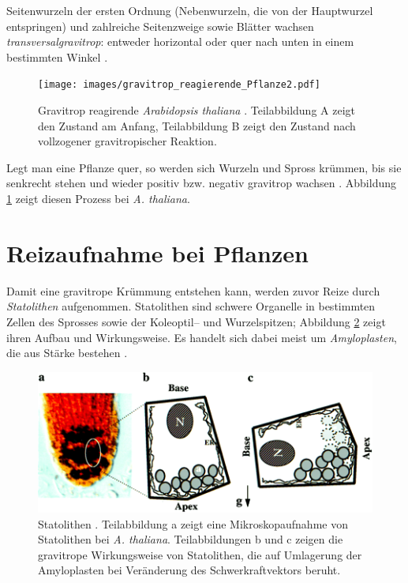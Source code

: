 \documentclass[
11pt, 
ngerman,
listof=totocnumbered,
oneside,
bibliography=totocnumbered,
abstracton
]{scrreprt}
\begin{document}
Seitenwurzeln der ersten Ordnung (Nebenwurzeln, die von der Hauptwurzel entspringen) und zahlreiche Seitenzweige sowie Blätter wachsen \emph{transversalgravitrop}: entweder horizontal oder quer nach unten in einem bestimmten Winkel \parencite[449]{Strasburger}. 

\begin{figure}[H]
\centering 
 \texttt{[image: images/gravitrop\_reagierende\_Pflanze2.pdf]}
 \caption{Gravitrop reagirende \emph{Arabidopsis thaliana} \parencite[5]{Masson2002}. Teilabbildung A zeigt den Zustand am Anfang, Teilabbildung B zeigt den Zustand nach vollzogener gravitropischer Reaktion. \label{gravitrop_reagierende_Pflanze}}
\end{figure} 
 
Legt man eine Pflanze quer, so werden sich Wurzeln und Spross krümmen, bis sie senkrecht stehen und wieder positiv bzw. negativ gravitrop wachsen \parencite[528]{Luettge}. Abbildung \ref{gravitrop_reagierende_Pflanze} zeigt diesen Prozess bei \emph{A. thaliana}. 

\section{Reizaufnahme bei Pflanzen}

Damit eine gravitrope Krümmung entstehen kann, werden zuvor Reize durch \emph{Statolithen} aufgenommen. Statolithen sind schwere Organelle in bestimmten Zellen des Sprosses sowie der Koleoptil-- und Wurzelspitzen; Abbildung \ref{Statolithen} zeigt ihren Aufbau und Wirkungsweise. Es handelt sich dabei meist um \emph{Amyloplasten}, die aus Stärke bestehen \parencite[530]{Luettge}.

\begin{figure}[H]
	\centering 
	\includegraphics[width = 0.75\linewidth]{images/Statolithen2.png}
	\caption{Statolithen \parencite[345]{Chen1999}. Teilabbildung a zeigt eine Mikroskopaufnahme von Statolithen bei \emph{A. thaliana}. Teilabbildungen b und c zeigen die gravitrope Wirkungsweise von Statolithen, die auf Umlagerung der Amyloplasten bei Veränderung des Schwerkraftvektors beruht. \label{Statolithen}}
\end{figure} 
\end{document}
